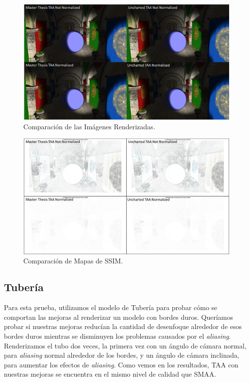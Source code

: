 \documentclass[pregrado]{tesis-usb} %
\begin{document}
\begin{figure}[!htb]
	\centering
	\includegraphics[scale=0.9]{images/results/sharpen_test_render.png}
	\caption{Comparación de las Imágenes Renderizadas.}\label{fig:sharpen_render}
\end{figure}

\begin{figure}[!htb]
	\centering
	\includegraphics[scale=0.9]{images/results/sharpen_test_ssim.png}
	\caption{Comparación de Mapas de SSIM.}\label{fig:sharpen_ssim}
\end{figure}

\FloatBarrier
\subsection{Tubería}
Para esta prueba, utilizamos el modelo de Tubería para probar cómo se comportan las mejoras al renderizar un modelo con bordes duros. Queríamos probar si nuestras mejoras reducían la cantidad de desenfoque alrededor de esos bordes duros mientras se disminuyen los problemas causados por el \textit{aliasing}. Renderizamos el tubo dos veces, la primera vez con un ángulo de cámara normal, para \textit{aliasing} normal alrededor de los bordes, y un ángulo de cámara inclinada, para aumentar los efectos de \textit{aliasing}. Como vemos en los resultados, TAA con nuestras mejoras se encuentra en el mismo nivel de calidad que SMAA.
\end{document}
